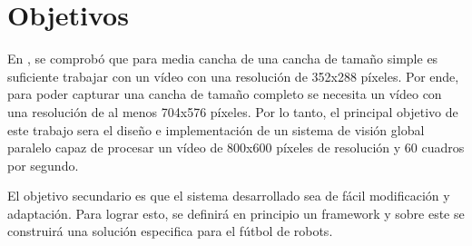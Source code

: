 
\section{Objetivos}

En \cite{torres2014}, se comprobó que para media cancha de una cancha de tamaño
simple es suficiente trabajar con un vídeo con una resolución de 352x288
píxeles. Por ende, para poder capturar una cancha de tamaño completo se necesita
un vídeo con una resolución de al menos 704x576 píxeles. Por lo tanto, el
principal objetivo de este trabajo sera el diseño e implementación de un sistema
de visión global paralelo capaz de procesar un vídeo de 800x600 píxeles de
resolución y 60 cuadros por segundo.

El objetivo secundario es que el sistema desarrollado sea de fácil modificación
y adaptación. Para lograr esto, se definirá en principio un framework y sobre
este se construirá una solución especifica para el fútbol de robots.
